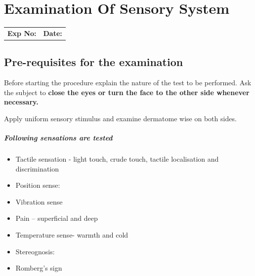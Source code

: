 \documentclass[a4paper,12pt,openany,twoside]{book}
\begin{document}
															\chapter*{\centering Examination Of Sensory System}
															\begin{tabular}{p{5in} p{1in}}
																\textbf{Exp No:}  & \textbf{Date:}\\
															\end{tabular}
															\section*{Pre-requisites for the examination}
				\par									Before starting the procedure explain the nature of the test to be performed. Ask the subject to \textbf{close the eyes or turn the face to the other side whenever necessary.}
															\par
Apply uniform sensory stimulus and examine dermatome wise on both sides.
\paragraph{Following sensations are tested}
\begin{itemize}
\item{Tactile sensation - light touch, crude touch, tactile localisation and 	discrimination}
\item{Position sense:}
\item{Vibration sense}
\item{Pain – superficial and deep}
\item{Temperature sense- warmth and cold}
\item{Stereognosis:}
\item{Romberg’s sign}
\end{itemize}
\end{document}
